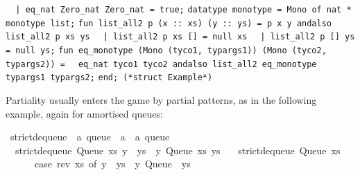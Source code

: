 \begin{isabellebody}
\begin{isamarkuptext}
\verb|  |\verb,|,\verb| eq_nat Zero_nat Zero_nat = true;|\newline%
\newline%
\verb|datatype monotype = Mono of nat * monotype list;|\newline%
\newline%
\verb|fun list_all2 p (x :: xs) (y :: ys) = p x y andalso list_all2 p xs ys|\newline%
\verb|  |\verb,|,\verb| list_all2 p xs [] = null xs|\newline%
\verb|  |\verb,|,\verb| list_all2 p [] ys = null ys;|\newline%
\newline%
\verb|fun eq_monotype (Mono (tyco1, typargs1)) (Mono (tyco2, typargs2)) =|\newline%
\verb|  eq_nat tyco1 tyco2 andalso list_all2 eq_monotype typargs1 typargs2;|\newline%
\newline%
\verb|end; (*struct Example*)|%
\end{isamarkuptext}%
\isamarkuptrue%
%
\endisatagquoteme
{\isafoldquoteme}%
%
\isadelimquoteme
%
\endisadelimquoteme
%
\isamarkuptrue%
%
\begin{isamarkuptext}%
Partiality usually enters the game by partial patterns, as
  in the following example, again for amortised queues:%
\end{isamarkuptext}%
\isamarkuptrue%
%
\isadelimquoteme
%
\endisadelimquoteme
%
\isatagquoteme
{}\isamarkupfalse%
\ strict{\isacharunderscore}dequeue\ {\isacharcolon}{\isacharcolon}\ {\isachardoublequoteopen}{\isacharprime}a\ queue\ {\isasymRightarrow}\ {\isacharprime}a\ {\isasymtimes}\ {\isacharprime}a\ queue{\isachardoublequoteclose}\ \isanewline
\ \ {\isachardoublequoteopen}strict{\isacharunderscore}dequeue\ {\isacharparenleft}Queue\ xs\ {\isacharparenleft}y\ {\isacharhash}\ ys{\isacharparenright}{\isacharparenright}\ {\isacharequal}\ {\isacharparenleft}y{\isacharcomma}\ Queue\ xs\ ys{\isacharparenright}{\isachardoublequoteclose}\isanewline
\ \ {\isacharbar}\ {\isachardoublequoteopen}strict{\isacharunderscore}dequeue\ {\isacharparenleft}Queue\ xs\ {\isacharbrackleft}{\isacharbrackright}{\isacharparenright}\ {\isacharequal}\isanewline
\ \ \ \ \ \ {\isacharparenleft}case\ rev\ xs\ of\ y\ {\isacharhash}\ ys\ {\isasymRightarrow}\ {\isacharparenleft}y{\isacharcomma}\ Queue\ {\isacharbrackleft}{\isacharbrackright}\ ys{\isacharparenright}{\isacharparenright}{\isachardoublequoteclose}%
\endisatagquoteme

\end{isabellebody}
